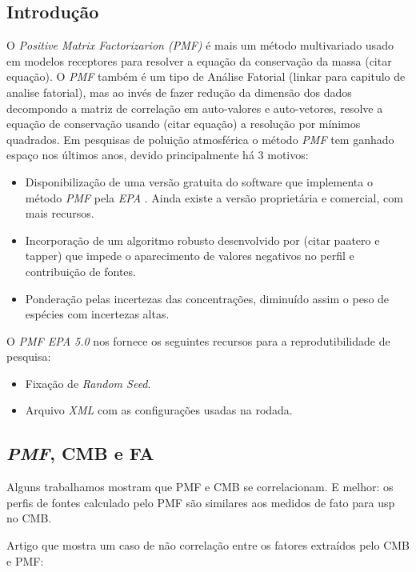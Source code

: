 \subsection{Introdução}
O \textit{Positive Matrix Factorizarion (PMF)} é mais um método multivariado usado em modelos receptores para resolver a equação da conservação da massa (citar equação). O \textit{PMF} também é um tipo de Análise Fatorial (linkar para capitulo de analise fatorial), mas ao invés de fazer redução da dimensão dos dados decompondo a matriz de correlação em auto-valores e auto-vetores, resolve a equação de conservação usando (citar equação) a resolução por mínimos quadrados. Em pesquisas de poluição atmosférica o método \textit{PMF} tem ganhado espaço nos últimos anos, devido principalmente há 3 motivos:

\begin{itemize}
  \item Disponibilização de uma versão gratuita do software que implementa o método \textit{PMF} pela \textit{EPA} \citep{Norris:2014}. Ainda existe a versão proprietária e comercial, com mais recursos.   
  \item Incorporação de um algoritmo robusto desenvolvido por (citar paatero e tapper) que impede o aparecimento de valores negativos no perfil e contribuição de fontes.
  \item Ponderação pelas incertezas das concentrações, diminuído assim o peso de espécies com incertezas altas.
\end{itemize}  

O \textit{PMF EPA 5.0} nos fornece os seguintes recursos para a reprodutibilidade de pesquisa:
\begin{itemize}
  \item Fixação de \textit{Random Seed}.
  \item Arquivo \textit{XML} com as configurações usadas na rodada. 
\end{itemize} 

\subsection{\textit{PMF}, CMB e FA}

Alguns trabalhamos mostram que PMF e CMB se correlacionam. E melhor: os perfis de fontes calculado pelo PMF são similares aos medidos de fato para usp no CMB. 

Artigo que mostra um caso de não correlação entre os fatores extraídos pelo CMB e PMF: %

